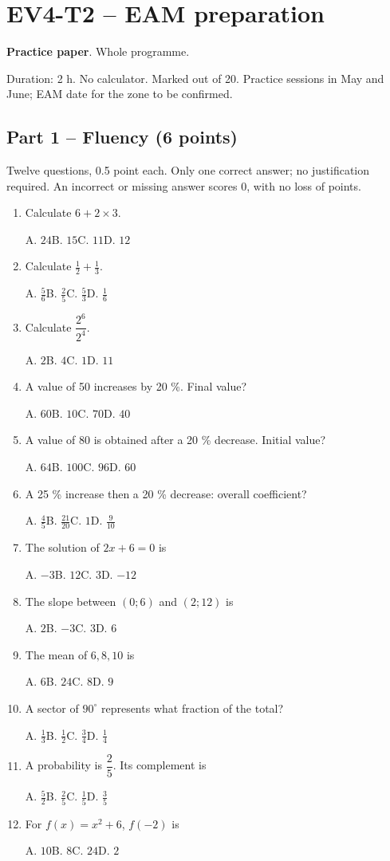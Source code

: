 \clearpage\section*{EV4-T2 -- EAM preparation}\label{EV4-T2}
\textbf{Practice paper}. Whole programme.\par Duration: 2 h. No calculator. Marked out of 20. Practice sessions in May and June; EAM date for the zone to be confirmed.
\subsection*{Part 1 -- Fluency (6 points)}
Twelve questions, 0.5 point each. Only one correct answer; no justification required. An incorrect or missing answer scores 0, with no loss of points.
\begin{enumerate}
\item Calculate $6+2\times3$.\par A. $24$\quad B. $15$\quad C. $11$\quad D. $12$
\item Calculate $\frac12+\frac13$.\par A. $\frac{5}{6}$\quad B. $\frac{2}{5}$\quad C. $\frac{5}{3}$\quad D. $\frac{1}{6}$
\item Calculate $\dfrac{2^6}{2^{4}}$.\par A. $2$\quad B. $4$\quad C. $1$\quad D. $11$
\item A value of 50 increases by 20 \%. Final value?\par A. $60$\quad B. $10$\quad C. $70$\quad D. $40$
\item A value of 80 is obtained after a 20 \% decrease. Initial value?\par A. $64$\quad B. $100$\quad C. $96$\quad D. $60$
\item A 25 \% increase then a 20 \% decrease: overall coefficient?\par A. $\frac{4}{5}$\quad B. $\frac{21}{20}$\quad C. $1$\quad D. $\frac{9}{10}$
\item The solution of $2x+6=0$ is\par A. $-3$\quad B. $12$\quad C. $3$\quad D. $-12$
\item The slope between $(0;6)$ and $(2;12)$ is\par A. $2$\quad B. $-3$\quad C. $3$\quad D. $6$
\item The mean of $6, 8, 10$ is\par A. $6$\quad B. $24$\quad C. $8$\quad D. $9$
\item A sector of $90^\circ$ represents what fraction of the total?\par A. $\frac{1}{3}$\quad B. $\frac{1}{2}$\quad C. $\frac{3}{4}$\quad D. $\frac{1}{4}$
\item A probability is $\dfrac{2}{5}$. Its complement is\par A. $\frac{5}{2}$\quad B. $\frac{2}{5}$\quad C. $\frac{1}{5}$\quad D. $\frac{3}{5}$
\item For $f(x)=x^2+6$, $f(-2)$ is\par A. $10$\quad B. $8$\quad C. $24$\quad D. $2$
\end{enumerate}
